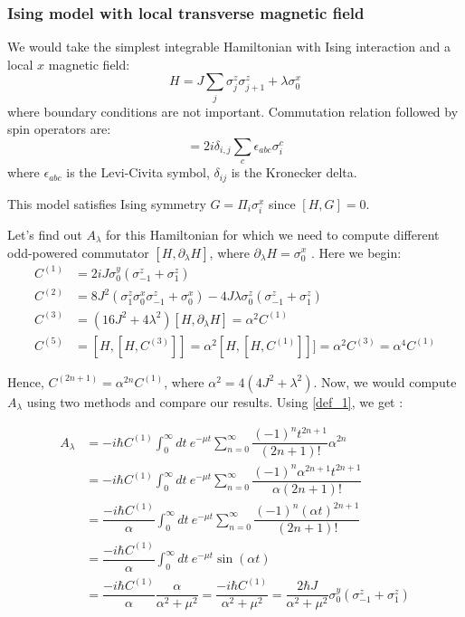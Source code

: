 \documentclass[11pt,a4paper]{article}
\begin{document}
\subsubsection{Ising model with local transverse magnetic field}
We would take the simplest integrable Hamiltonian with Ising interaction and a local $x$ magnetic field:
\begin{equation}
H= J \sum_{j}  \sigma_j^z \sigma_{j+1}^z +  \lambda  \sigma_0^x
\label{zz}
\end{equation}
where boundary conditions are not important. Commutation relation followed by spin operators are:
\begin{equation}
[\sigma_i^a, \sigma_{j}^b]= 2 i   \delta_{i,j} \sum_c  \epsilon_{a b c} \sigma_i^c
\end{equation}
where $\epsilon_{abc}$ is the Levi-Civita symbol, $ \delta_{ij}$ is the Kronecker delta.

This model satisfies Ising symmetry $G= \Pi_i \sigma_i^x$ since $[H, G]=0$.


Let's find out $A_{\lambda}$ for this Hamiltonian for which we need to compute different odd-powered commutator $[H, \partial_{\lambda} H]$, where $\partial_{\lambda} H=\sigma_0^x$ . Here we begin:
\begin{align}
C^{(1)}&= 2 i J \sigma_0^y ( \sigma_{-1}^z + \sigma_1^z) \\ 
C^{(2)}&= 8 J^2(\sigma^z_1 \sigma^x_0 \sigma^z_{-1} + \sigma^x_0) - 4J \lambda \sigma_0^z( \sigma_{-1}^z + \sigma_1^z) \\
C^{(3)} &=  (16 J^2 + 4 \lambda ^2) [H, \partial_{\lambda} H] = \alpha^2  C^{(1)} \\
C^{(5)}&=[H,[H, C^{(3)}]]  = \alpha^2 [H, [H,C^{(1)}]]]=\alpha^2 C^{(3)}=  \alpha^4 C^{(1)}   
\end{align}


Hence, $C^{(2n+1)}= \alpha^{2n} C^{(1)}$, where $\alpha^2= 4 (4 J^2 +  \lambda ^2) $. Now, we would compute $A_{\lambda}$ using two methods and compare our results. Using \ref{def_1}, we get :

\begin{align*}
A_{\lambda} &= -i \hbar    C^{(1)} \int_0^{\infty} dt\ e^{-\mu t} \sum_{n=0}^{\infty} \dfrac{(-1)^{n} t ^{2n+1}}{(2n+1)!}  \alpha^{2n}  \\
 &= -i \hbar    C^{(1)} \int_0^{\infty} dt\ e^{-\mu t} \sum_{n=0}^{\infty} \dfrac{(-1)^{n}  \alpha^{2n+1} t ^{2n+1}}{\alpha(2n+1)!}   \\
  &= \dfrac{-i \hbar    C^{(1)}}{\alpha} \int_0^{\infty} dt\ e^{-\mu t} \sum_{n=0}^{\infty} \dfrac{(-1)^{n}  (\alpha t)^{2n+1}}{(2n+1)!}   \\
    &= \dfrac{-i \hbar    C^{(1)}}{\alpha} \int_0^{\infty} dt\ e^{-\mu t}  \sin  (\alpha t)   \\
     &= \dfrac{-i \hbar    C^{(1)}}{\alpha} \dfrac{\alpha}{\alpha^2 + \mu^2} =\dfrac{-i \hbar    C^{(1)}}{{\alpha^2 + \mu^2}} =  \dfrac{2 \hbar J}{{\alpha^2 + \mu^2}} \sigma_0^y ( \sigma_{-1}^z + \sigma_1^z) 
\end{align*}
 
\end{document}
